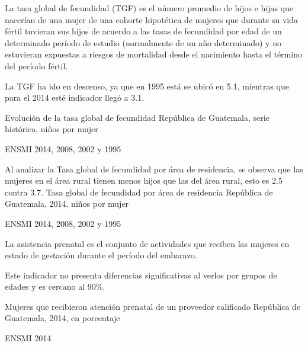 
%
{%
	La tasa global de fecundidad (TGF) es el número promedio de hijos e hijas que nacerían de una mujer de una cohorte hipotética de mujeres que durante su vida fértil tuvieran sus hijos de acuerdo a las tasas de fecundidad por edad de un determinado período de estudio (normalmente de un año determinado) y no estuvieran expuestas a riesgos de mortalidad desde el nacimiento hasta el término del período fértil. 
	
	La TGF ha ido en descenso, ya que en 1995 está se ubicó en 5.1, mientras que para el 2014 esté indicador llegó a 3.1. 
}%
{%
	Evolución de la tasa global de fecundidad} %
{%
	República de Guatemala, serie histórica, niños por mujer} %
{%
	\begin{tikzpicture}[x=1pt,y=1pt]    \end{tikzpicture}}%
{%
	ENSMI 2014, 2008, 2002 y 1995} %


%
{%
	Al analizar la Tasa global de fecundidad por área de residencia, se observa que las mujeres en el área rural tienen menos hijos que las del área rural, esto es 2.5 contra 3.7. 
}%
{%
	Tasa global de fecundidad por área de residencia} %
{%
	República de Guatemala, 2014, niños por mujer} %
{%
	\begin{tikzpicture}[x=1pt,y=1pt]    \end{tikzpicture}}%
{%
	ENSMI 2014, 2008, 2002 y 1995} %




%
{%
	La asistencia prenatal es el conjunto de actividades que reciben las mujeres en estado de gestación durante el período del embarazo. 
	
	Este indicador no presenta diferencias significativas al verlos por grupos de edades y es cercano al 90\%. 
}%
{%
	Mujeres que recibieron atención prenatal de un proveedor calificado} %
{%
	República de Guatemala, 2014, en porcentaje} %
{%
	\begin{tikzpicture}[x=1pt,y=1pt]    \end{tikzpicture}}%
{%
	ENSMI 2014} %


